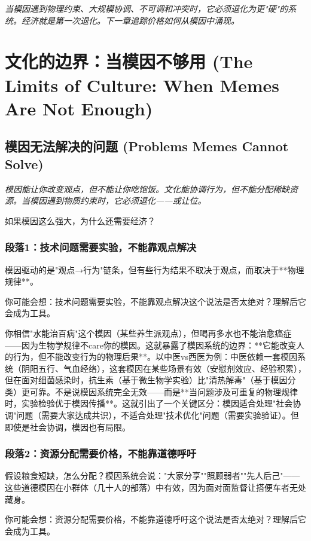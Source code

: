 \documentclass[a4paper,12pt]{book}
\newenvironment{motivation}{\begin{tcolorbox}[colback=gray!10,colframe=gray!60,title=\textit{本章动机 (Motivation)},fonttitle=\bfseries,arc=0mm,leftrule=3mm]\small\itshape}{\end{tcolorbox}}
\newenvironment{questionbox}{\begin{tcolorbox}[colback=red!3!white,colframe=red!60!black]}{\end{tcolorbox}}
\begin{document}
\begin{motivation}
\begin{motivation}
\begin{motivation}
当模因遇到物理约束、大规模协调、不可调和冲突时，它必须退化为更"硬"的系统。经济就是第一次退化。下一章追踪价格如何从模因中涌现。


	
	\section{文化的边界：当模因不够用 (The Limits of Culture: When Memes Are Not Enough)}

	\subsection{模因无法解决的问题 (Problems Memes Cannot Solve)}
	\begin{motivation}
		模因能让你改变观点，但不能让你吃饱饭。文化能协调行为，但不能分配稀缺资源。当模因遇到物质约束时，它必须退化——或让位。
	\end{motivation}
	\begin{questionbox}
		如果模因这么强大，为什么还需要经济？
	\end{questionbox}

	\subsubsection*{段落1：技术问题需要实验，不能靠观点解决}
	模因驱动的是"观点→行为"链条，但有些行为结果不取决于观点，而取决于**物理规律**。
	\begin{tcolorbox}[colback=yellow!5, title=\textit{读者行为预测}]
		你可能会想：技术问题需要实验，不能靠观点解决这个说法是否太绝对？理解后它会成为工具。
	\end{tcolorbox}

你相信"水能治百病"这个模因（某些养生派观点），但喝再多水也不能治愈癌症——因为生物学规律不care你的模因。这就暴露了模因系统的边界：**它能改变人的行为，但不能改变行为的物理后果**。以中医vs西医为例：中医依赖一套模因系统（阴阳五行、气血经络），这套模因在某些场景有效（安慰剂效应、经验积累），但在面对细菌感染时，抗生素（基于微生物学实验）比"清热解毒"（基于模因分类）更可靠。不是说模因系统完全无效——而是**当问题涉及可重复的物理规律时，实验检验优于模因传播**。这就引出了一个关键区分：模因适合处理"社会协调"问题（需要大家达成共识），不适合处理"技术优化"问题（需要实验验证）。但即使是社会协调，模因也有局限。

	\subsubsection*{段落2：资源分配需要价格，不能靠道德呼吁}
	假设粮食短缺，怎么分配？模因系统会说："大家分享""照顾弱者""先人后己"——这些道德模因在小群体（几十人的部落）中有效，因为面对面监督让搭便车者无处藏身。
	\begin{tcolorbox}[colback=yellow!5, title=\textit{读者行为预测}]
		你可能会想：资源分配需要价格，不能靠道德呼吁这个说法是否太绝对？理解后它会成为工具。
	\end{tcolorbox}


\end{motivation}
\end{motivation}
\end{motivation}
\end{document}

